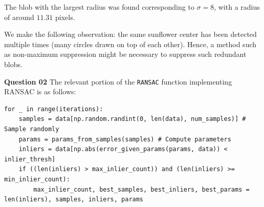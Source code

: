 \documentclass{article}[a4paper]
\begin{document}
	The blob with the largest radius was found corresponding to $\sigma = 8$, with a radius of around $11.31$ pixels.

	We make the following observation: the same sunflower center has been detected multiple times (many circles drawn on top of each other). Hence, a method such as non-maximum suppression might be necessary to suppress such redundant blobs.
	
    \textbf{Question 02} The relevant portion of the \lstinline|RANSAC| function implementing RANSAC is as follows:
	\begin{lstlisting}
for _ in range(iterations):
	samples = data[np.random.randint(0, len(data), num_samples)] # Sample randomly
	params = params_from_samples(samples) # Compute parameters
	inliers = data[np.abs(error_given_params(params, data)) < inlier_thresh]
	if ((len(inliers) > max_inlier_count)) and (len(inliers) >= min_inlier_count):
		max_inlier_count, best_samples, best_inliers, best_params = len(inliers), samples, inliers, params
	\end{lstlisting}
\end{document}
